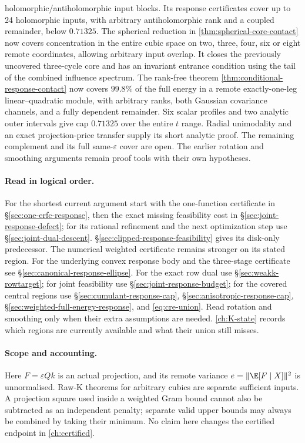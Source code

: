{holomorphic/antiholomorphic input blocks. Its response certificates
cover up to 24 holomorphic inputs, with arbitrary antiholomorphic rank
and a coupled remainder, below $0.71325$.
The spherical reduction in \autoref{thm:spherical-core-contact}
now covers concentration in the entire cubic space on two, three,
four, six or eight remote coordinates, allowing arbitrary input overlap.
It closes the previously uncovered three-cycle core and has an invariant
entrance condition using the tail of the combined influence spectrum.
The rank-free theorem \autoref{thm:conditional-response-contact}
now covers $99.8\%$ of the full energy in a remote exactly-one-leg
linear--quadratic module, with arbitrary ranks, both Gaussian covariance
channels, and a fully dependent remainder. Six scalar profiles and two
analytic outer intervals give cap $0.71325$ over the entire $t$ range.
Radial unimodality and an exact projection-price transfer supply its
short analytic proof. The remaining complement and its full
same-$\varepsilon$ cover are open. The earlier rotation
and smoothing arguments remain proof tools with their own hypotheses.}

\paragraph{Read in logical order.}
For the shortest current argument start with the one-function certificate
in \S\ref{sec:one-erfc-response}, then the exact missing feasibility cost
in \S\ref{sec:joint-response-defect};
for its rational refinement and the next optimization step use
\S\ref{sec:joint-dual-descent}.
\S\ref{sec:clipped-response-feasibility} gives its disk-only predecessor.
The numerical weighted
certificate remains stronger on its stated region. For the underlying
convex response body and the three-stage certificate see
\S\ref{sec:canonical-response-ellipse}. For the exact row dual use
\S\ref{sec:weakk-rowtarget}; for joint feasibility use
\S\ref{sec:joint-response-budget}; for the covered central regions use
\S\ref{sec:cumulant-response-cap}, \S\ref{sec:anisotropic-response-cap},
\S\ref{sec:weighted-full-energy-response}, and \eqref{eq:cre-union}.
Read rotation and smoothing only when their
extra assumptions are needed. \autoref{ch:K-state} records which
regions are currently available and what their union still misses.

\paragraph{Scope and accounting.}
Here $F=\varepsilon Qk$ is an actual projection, and its remote variance
$e=\|\E[F\mid X]\|^2$ is unnormalised. Raw-K theorems for arbitrary cubics
are separate sufficient inputs. A projection square used inside a weighted
Gram bound cannot also be subtracted as an independent penalty; separate
valid upper bounds may always be combined by taking their minimum.
No claim here changes the certified endpoint in \autoref{ch:certified}.

